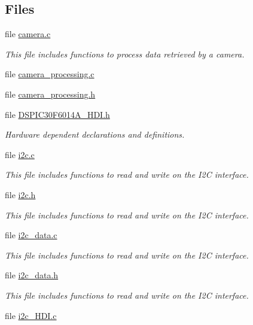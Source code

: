 \subsection*{Files}
\begin{DoxyCompactItemize}
\item 
file \hyperlink{camera_8c}{camera.\+c}
\begin{DoxyCompactList}\small\item\em This file includes functions to process data retrieved by a camera. \end{DoxyCompactList}\item 
file \hyperlink{camera__processing_8c}{camera\+\_\+processing.\+c}
\item 
file \hyperlink{camera__processing_8h}{camera\+\_\+processing.\+h}
\item 
file \hyperlink{DSPIC30F6014A__HDI_8h}{D\+S\+P\+I\+C30\+F6014\+A\+\_\+\+H\+D\+I.\+h}
\begin{DoxyCompactList}\small\item\em Hardware dependent declarations and definitions. \end{DoxyCompactList}\item 
file \hyperlink{i2c_8c}{i2c.\+c}
\begin{DoxyCompactList}\small\item\em This file includes functions to read and write on the I2\+C interface. \end{DoxyCompactList}\item 
file \hyperlink{i2c_8h}{i2c.\+h}
\begin{DoxyCompactList}\small\item\em This file includes functions to read and write on the I2\+C interface. \end{DoxyCompactList}\item 
file \hyperlink{i2c__data_8c}{i2c\+\_\+data.\+c}
\begin{DoxyCompactList}\small\item\em This file includes functions to read and write on the I2\+C interface. \end{DoxyCompactList}\item 
file \hyperlink{i2c__data_8h}{i2c\+\_\+data.\+h}
\begin{DoxyCompactList}\small\item\em This file includes functions to read and write on the I2\+C interface. \end{DoxyCompactList}\item 
file \hyperlink{i2c__HDI_8c}{i2c\+\_\+\+H\+D\+I.\+c}

\end{DoxyCompactItemize}
